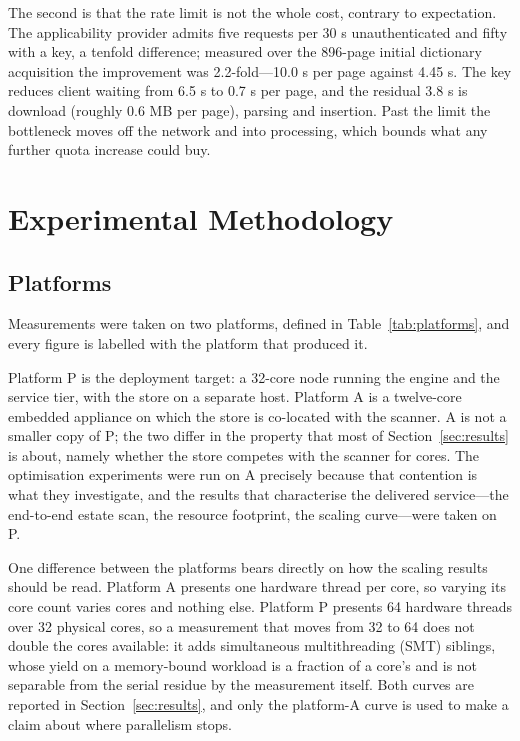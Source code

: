 \documentclass[fleqn,10pt,lineno]{wlpeerj}
\begin{document}
The second is that the rate limit is not the whole cost, contrary to expectation. The applicability provider admits five requests per 30 s unauthenticated and fifty with a key, a tenfold difference; measured over the 896-page initial dictionary acquisition the improvement was 2.2-fold---10.0 s per page against 4.45 s. The key reduces client waiting from 6.5 s to 0.7 s per page, and the residual 3.8 s is download (roughly 0.6 MB per page), parsing and insertion. Past the limit the bottleneck moves off the network and into processing, which bounds what any further quota increase could buy.

\section{Experimental Methodology}
\label{sec:methodology}

\subsection{Platforms}
Measurements were taken on two platforms, defined in Table~\ref{tab:platforms}, and every figure is labelled with the platform that produced it.



Platform P is the deployment target: a 32-core node running the engine and the service tier, with the store on a separate host. Platform A is a twelve-core embedded appliance on which the store is co-located with the scanner. A is not a smaller copy of P; the two differ in the property that most of Section~\ref{sec:results} is about, namely whether the store competes with the scanner for cores. The optimisation experiments were run on A precisely because that contention is what they investigate, and the results that characterise the delivered service---the end-to-end estate scan, the resource footprint, the scaling curve---were taken on P.

One difference between the platforms bears directly on how the scaling results should be read. Platform A presents one hardware thread per core, so varying its core count varies cores and nothing else. Platform P presents 64 hardware threads over 32 physical cores, so a measurement that moves from 32 to 64 does not double the cores available: it adds simultaneous multithreading (SMT) siblings, whose yield on a memory-bound workload is a fraction of a core's and is not separable from the serial residue by the measurement itself. Both curves are reported in Section~\ref{sec:results}, and only the platform-A curve is used to make a claim about where parallelism stops.
\end{document}

